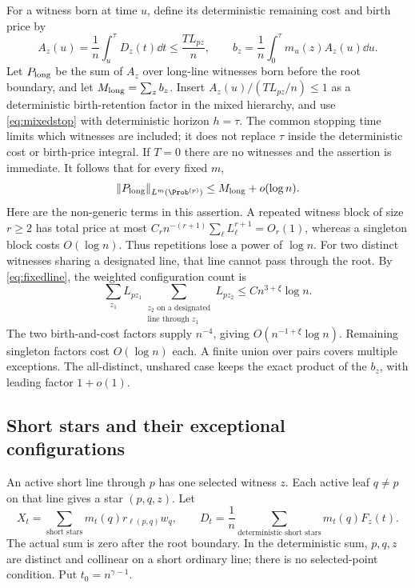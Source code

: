 For a witness born at time \(u\), define its deterministic remaining
cost and birth price by
\[
 A_z(u)=\frac1n\int_u^\tau D_z(t)\dd t\le\frac{TL_{pz}}n,
 \qquad b_z=\frac1n\int_0^\tau m_u(z)A_z(u)\dd u.
\]
Let \(P_{\rm long}\) be the sum of \(A_z\) over long-line witnesses
born before the root boundary, and let \(M_{\rm long}=\sum_z b_z\).
Insert \(A_z(u)/(TL_{pz}/n)\le1\) as a deterministic birth-retention
factor in the mixed hierarchy, and use \eqref{eq:mixedstop}
with deterministic horizon \(h=\tau\). The common stopping time
limits which witnesses are included; it does not replace \(\tau\)
inside the deterministic cost or birth-price integral. If \(T=0\)
there are no witnesses and the assertion is immediate.
It follows that for every fixed \(m\),
\begin{equation}\label{eq:longproxy}
 \|P_{\rm long}\|_{L^m(\Prob^{(p)})}
 \le M_{\rm long}+o(\log n).
\end{equation}
Here are the non-generic terms in this assertion. A repeated witness
block of size \(r\ge2\) has total price at most
\(C_r n^{-(r+1)}\sum_\ell L_\ell^{r+1}=O_r(1)\), whereas a
singleton block costs \(O(\log n)\). Thus repetitions lose a power
of \(\log n\). For two distinct witnesses sharing a designated
line, that line cannot pass through the root. By
\eqref{eq:fixedline}, the weighted configuration count is
\[
 \sum_{z_1}L_{pz_1}
 \sum_{\substack{z_2\text{ on a designated}\\\text{line through }z_1}}L_{pz_2}
 \le C n^{3+\xi}\log n.
\]
The two birth-and-cost factors supply \(n^{-4}\), giving
\(O(n^{-1+\xi}\log n)\). Remaining singleton factors cost
\(O(\log n)\) each. A finite union over pairs covers multiple
exceptions. The all-distinct, unshared case keeps the exact product
of the \(b_z\), with leading factor \(1+o(1)\).

\subsection{Short stars and their exceptional configurations}
An active short line through \(p\) has one selected witness \(z\).
Each active leaf \(q\ne p\) on that line gives a star \((p,q,z)\).
Let
\[
 X_t=\sum_{\text{short stars}}m_t(q)r_{\ell(p,q)}w_q,
 \qquad
 D_t=\frac1n\sum_{\text{deterministic short stars}}m_t(q)F_z(t).
\]
The actual sum is zero after the root boundary. In the deterministic
sum, \(p,q,z\) are distinct and collinear on a short ordinary line;
there is no selected-point condition.
Put \(t_0=n^{\gamma-1}\).

